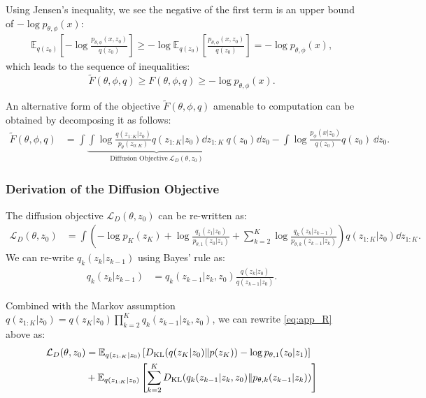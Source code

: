 Using Jensen's inequality, we see the negative of the first term is an upper bound of $-\log p_{\theta, \phi}(x)$:
\begin{align*}
    \mathbb{E}_{q(z_0)}\left[ -\log \frac{p_{\theta, \phi}(x, z_0)}{q(z_0)} \right] \geq -\log \mathbb{E}_{q(z_0)}\left[ \frac{p_{\theta, \phi}(x, z_0)}{q(z_0)} \right] = -\log p_{\theta, \phi}(x),
\end{align*}
which leads to the sequence of inequalities:
\begin{equation}
    \tilde{F}(\theta, \phi, q) \geq F(\theta, \phi, q) \geq -\log p_{\theta, \phi}(x).
\end{equation}


An alternative form of the objective $\tilde{F}(\theta, \phi, q)$ amenable to computation can be obtained by decomposing it as follows:
\begin{align}
    \tilde{F}(\theta, \phi, q) &= \int \underbrace{\int \log \frac{q(z_{1:K}|z_{0})}{{p_{\theta}(z_{0:K})}} q(z_{1:K}|z_{0}) \dd z_{1:K} \ }_{\text{Diffusion Objective}  \ \mathcal{L}_D(\theta, z_0)}q(z_{0})\dd z_{0} - {\int \log \frac{{p_{\phi}( x|z_{0})}}{q(z_{0})} q(z_{0}) \ \dd z_{0}}.\label{eq_app:decomposed_obj}
\end{align}


\subsubsection{Derivation of the Diffusion Objective}
The diffusion objective $\mathcal{L}_D(\theta, z_0)$ can be re-written as:
\begin{align}
    \mathcal{L}_D(\theta, z_0) 
    &=\int\left(-\log p_K(z_K)+\log \frac{q_1(z_1|z_0)}{p_{\theta, 1} (z_0|z_1)}+\sum_{k=2}^K \log \frac{q_k(z_k| z_{k-1})}{p_{\theta, k}(z_{k-1}|z_k)}\right)q(z_{1:K}|z_{0})\dd z_{1:K}.\label{eq:app_R}
\end{align}
We can re-write $q_k(z_k|z_{k-1})$ using Bayes' rule as:
\begin{align*}
q_k(z_{k}|z_{k-1})
&=q_k(z_{k-1}|z_{k},z_0)\frac{q(z_{k}|z_0)}{q(z_{k-1}|z_0)}.
\end{align*}

Combined with the Markov assumption $q(z_{1:K}|z_{0})=q(z_K|z_0)\prod_{k=2}^K q_k(z_{k-1}| z_{k}, z_{0})$,  we can rewrite \eqref{eq:app_R} above as:
\begin{align}
    \mathcal{L}_D(\theta, z_0) 
    &= \mathbb{E}_{q(z_{1:K}|z_0)}\left[ D_{\mathrm{KL}}(q(z_K|z_0) \| p(z_K)) - \log p_{\theta, 1} (z_0|z_1) \right]  \\
    &+ \mathbb{E}_{q(z_{1:K}|z_0)}\left[\sum_{k=2}^K D_{\mathrm{KL}} ({q_k(z_{k-1}| z_{k}, z_0)}\|{p_{\theta, k}(z_{k-1}|z_k)}) \right]
\end{align}
